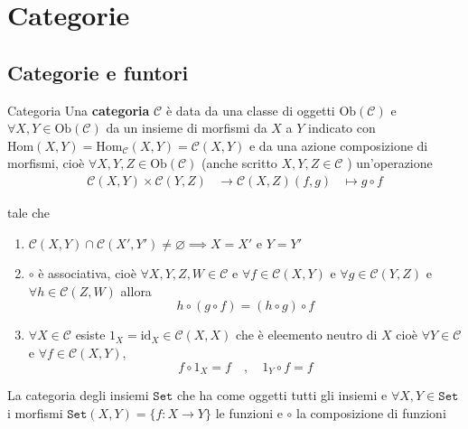 \chapter{Categorie}

\section{Categorie e funtori}

\begin{definition}{Categoria}
    Una \textbf{categoria} \(\mathcal{C}\) è data da una classe di oggetti \(\mathrm{Ob}{(\mathcal{C})}\) e \(\forall X, Y \in \mathrm{Ob}{(\mathcal{C})}\) da un insieme di morfismi da \(X \) a \(Y\) indicato con
    \(\mathrm{Hom}{(X,Y)} = \mathrm{Hom}_\mathcal{C} {(X, Y)} = \mathcal{C}{(X, Y)}\)  e da una
   azione  composizione di morfismi, cioè \(\forall X, Y, Z \in \mathrm{Ob}{(\mathcal{C})}\)
    (anche scritto \(X, Y, Z \in \mathcal{C}\) ) un'operazione 
    \begin{align*}
        \mathcal{C}{(X, Y)} \times  \mathcal{C}{(Y, Z)} &\to  \mathcal{C}{(X, Z)}
        {(f, g)} &\mapsto g \circ f
    \end{align*}

    tale che 
\begin{enumerate}[label = \arabic*.]
    \item[0.] \(\mathcal{C}{(X,Y)} \cap  \mathcal{C}{(X', Y')} \neq \varnothing \implies X = X' \text{ e } Y = Y'\) 
    \item[1.] \(\circ\) è associativa, cioè \(\forall X, Y, Z, W \in \mathcal{C}\) e \(\forall f \in \mathcal{C}{(X,Y)}\) e \(\forall g \in \mathcal{C}{(Y, Z)}\) e \(\forall h \in \mathcal{C}{(Z, W)}\)  allora 
        \[
          h \circ {(g \circ f)} = {(h \circ g)} \circ f
        \]
    \item[2.] \(\forall  X \in  \mathcal{C} \) esiste \(1_X = \mathrm{id}_X \in \mathcal{C}{(X, X)}\)
        che è eleemento neutro di \(X\) cioè \(\forall Y \in \mathcal{C}\) e \(\forall f
        \in \mathcal{C}{(X, Y)}\), 
        \[
          f \circ 1_X = f \quad, \quad 1_Y \circ f = f
        \]
\end{enumerate}
\end{definition}
\begin{example}{}
    La categoria degli insiemi \(\mathtt{Set} \) che ha come oggetti tutti gli
    insiemi e \(\forall X, Y \in \mathtt{Set} \) i morfismi \(\mathtt{Set}{(X, Y)} = \{f : X \to Y\}  \) le funzioni e \(\circ\) la composizione di funzioni
\end{example}
